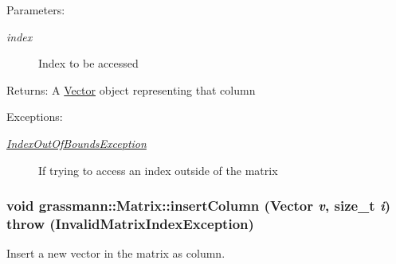 \begin{Desc}
\item[Parameters:]
\begin{description}
\item[{\em index}]Index to be accessed \end{description}
\end{Desc}
\begin{Desc}
\item[Returns:]A \hyperlink{classgrassmann_1_1Vector}{Vector} object representing that column \end{Desc}
\begin{Desc}
\item[Exceptions:]
\begin{description}
\item[{\em \hyperlink{classgrassmann_1_1IndexOutOfBoundsException}{IndexOutOfBoundsException}}]If trying to access an index outside of the matrix \end{description}
\end{Desc}
\hypertarget{classgrassmann_1_1Matrix_94cd405dc70cdc2a385cce409b33424a}{
\subsubsection[insertColumn]{\setlength{\rightskip}{0pt plus 5cm}void grassmann::Matrix::insertColumn ({\bf Vector} {\em v}, \/  size\_\-t {\em i})  throw ({\bf InvalidMatrixIndexException})}}
\label{classgrassmann_1_1Matrix_94cd405dc70cdc2a385cce409b33424a}


Insert a new vector in the matrix as column. 

